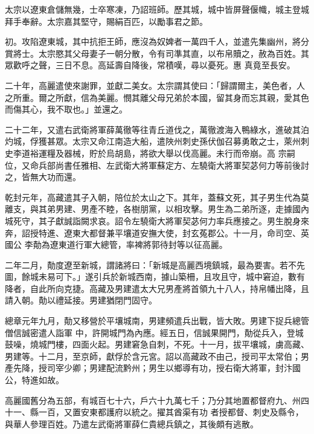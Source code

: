 \begin{pinyinscope}
 太宗以遼東倉儲無幾，士卒寒凍，乃詔班師。歷其城，城中皆屏聲偃幟，城主登城拜手奉辭。太宗嘉其堅守，賜絹百匹，以勵事君之節。



 初。攻陷遼東城，其中抗拒王師，應沒為奴婢者一萬四千人，並遣先集幽州，將分賞將士。太宗愍其父母妻子一朝分散，令有司準其直，以布帛贖之，赦為百姓。其眾歡呼之聲，三日不息。高延壽自降後，常積嘆，尋以憂死。惠
 真竟至長安。



 二十年，高麗遣使來謝罪，並獻二美女。太宗謂其使曰：「歸謂爾主，美色者，人之所重。爾之所獻，信為美麗。憫其離父母兄弟於本國，留其身而忘其親，愛其色而傷其心，我不取也。」並還之。



 二十二年，又遣右武衛將軍薛萬徹等往青丘道伐之，萬徹渡海入鴨綠水，進破其泊灼城，俘獲甚眾。太宗又命江南造大船，遣陜州刺史孫伏伽召募勇敢之士，萊州刺史李道裕運糧及器械，貯於烏胡島，將欲大舉以伐高麗。未行而帝崩。高
 宗嗣位，又命兵部尚書任雅相、左武衛大將軍蘇定方、左驍衛大將軍契苾何力等前後討之，皆無大功而還。



 乾封元年，高藏遣其子入朝，陪位於太山之下。其年，蓋蘇文死，其子男生代為莫離支，與其弟男建、男產不睦，各樹朋黨，以相攻擊。男生為二弟所逐，走據國內城死守，其子獻誠詣闕求哀。詔令左驍衛大將軍契苾何力率兵應接之。男生脫身來奔，詔授特進、遼東大都督兼平壤道安撫大使，封玄菟郡公。十一月，命司空、英國公
 李勣為遼東道行軍大總管，率裨將郭待封等以征高麗。



 二年二月，勣度遼至新城，謂諸將曰：「新城是高麗西境鎮城，最為要害。若不先圖，餘城未易可下。」遂引兵於新城西南，據山築柵，且攻且守，城中窘迫，數有降者，自此所向克捷。高藏及男建遣太大兄男產將首領九十八人，持帛幡出降，且請入朝。勣以禮延接。男建猶閉門固守。



 總章元年九月，勣又移營於平壤城南，男建頻遣兵出戰，皆大敗。男建下捉兵總管僧信誠密遣人詣軍
 中，許開城門為內應。經五日，信誠果開門，勣從兵入，登城鼓噪，燒城門樓，四面火起。男建窘急自刺，不死。十一月，拔平壤城，虜高藏、男建等。十二月，至京師，獻俘於含元宮。詔以高藏政不由己，授司平太常伯；男產先降，授司宰少卿；男建配流黔州；男生以鄉導有功，授右衛大將軍，封汴國公，特進如故。



 高麗國舊分為五部，有城百七十六，戶六十九萬七千；乃分其地置都督府九、州四十一、縣一百，又置安東都護府以統之。擢其酋渠有功
 者授都督、刺史及縣令，與華人參理百姓。乃遣左武衛將軍薛仁貴總兵鎮之，其後頗有逃散。




\end{pinyinscope}
